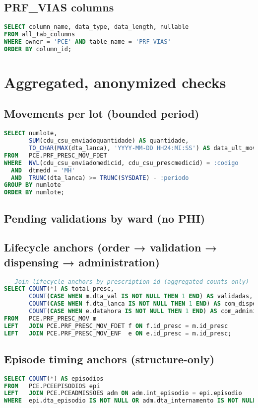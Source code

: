 \subsection*{PRF\_VIAS columns}
\begin{lstlisting}[language=SQL]
SELECT column_name, data_type, data_length, nullable
FROM all_tab_columns
WHERE owner = 'PCE' AND table_name = 'PRF_VIAS'
ORDER BY column_id;
\end{lstlisting}

\section{Aggregated, anonymized checks}
\subsection*{Movements per lot (bounded period)}
\begin{lstlisting}[language=SQL]
SELECT numlote,
       SUM(cdu_csu_enviadoquantidade) AS quantidade,
       TO_CHAR(MAX(dta_lanca), 'YYYY-MM-DD HH24:MI:SS') AS data_ult_mov
FROM   PCE.PRF_PRESC_MOV_FDET
WHERE  NVL(cdu_csu_enviadomedicid, cdu_csu_prescmedicid) = :codigo
  AND  dtmedd = 'MH'
  AND  TRUNC(dta_lanca) >= TRUNC(SYSDATE) - :periodo
GROUP BY numlote
ORDER BY numlote;
\end{lstlisting}

\subsection*{Pending validations by ward (no PHI)}
\subsection*{Lifecycle anchors (order → validation → dispensing → administration)}
\begin{lstlisting}[language=SQL]
-- Join lifecycle anchors by prescription id (aggregated counts only)
SELECT COUNT(*) AS total_presc,
       COUNT(CASE WHEN m.dta_val IS NOT NULL THEN 1 END) AS validadas,
       COUNT(CASE WHEN f.dta_lanca IS NOT NULL THEN 1 END) AS com_dispensa,
       COUNT(CASE WHEN e.datahora IS NOT NULL THEN 1 END) AS com_administracao
FROM   PCE.PRF_PRESC_MOV m
LEFT   JOIN PCE.PRF_PRESC_MOV_FDET f ON f.id_presc = m.id_presc
LEFT   JOIN PCE.PRF_PRESC_MOV_ENF  e ON e.id_presc = m.id_presc;
\end{lstlisting}

\subsection*{Episode timing anchors (structure-only)}
\begin{lstlisting}[language=SQL]
SELECT COUNT(*) AS episodios
FROM   PCE.PCEEPISODIOS epi
LEFT   JOIN PCE.PCEADMISSOES adm ON adm.int_episodio = epi.episodio
WHERE  epi.dta_episodio IS NOT NULL OR adm.dta_internamento IS NOT NULL;
\end{lstlisting}
